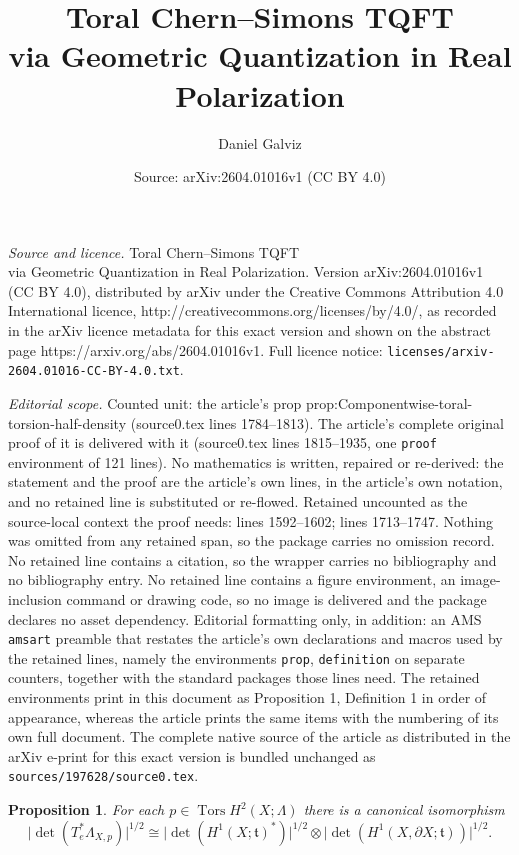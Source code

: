 \documentclass[10pt,a4paper]{amsart}
\title{Toral Chern--Simons TQFT\\via Geometric Quantization in Real Polarization}
\author{Daniel Galviz}
\date{Source: arXiv:2604.01016v1 (CC BY 4.0)}
\newtheorem{prop}{Proposition}
\begin{document}
\maketitle

\noindent\emph{Source and licence.} Toral Chern--Simons TQFT\\via Geometric Quantization in Real Polarization. Version arXiv:2604.01016v1 (CC BY 4.0), distributed by arXiv under the Creative Commons Attribution 4.0 International licence, http://creativecommons.org/licenses/by/4.0/, as recorded in the arXiv licence metadata for this exact version and shown on the abstract page https://arxiv.org/abs/2604.01016v1. Full licence notice: \texttt{licenses/arxiv-2604.01016-CC-BY-4.0.txt}.\par\smallskip

\noindent\textit{Editorial scope.} Counted unit: the article's prop prop:Componentwise-toral-torsion-half-density (source0.tex lines 1784--1813). The article's complete original proof of it is delivered with it (source0.tex lines 1815--1935, one \texttt{proof} environment of 121 lines). No mathematics is written, repaired or re-derived: the statement and the proof are the article's own lines, in the article's own notation, and no retained line is substituted or re-flowed.  Retained uncounted as the source-local context the proof needs: lines 1592--1602; lines 1713--1747.  Nothing was omitted from any retained span, so the package carries no omission record.  No retained line contains a citation, so the wrapper carries no bibliography and no bibliography entry.  No retained line contains a figure environment, an image-inclusion command or drawing code, so no image is delivered and the package declares no asset dependency.  Editorial formatting only, in addition: an AMS \texttt{amsart} preamble that restates the article's own declarations and macros used by the retained lines, namely the environments \texttt{prop}, \texttt{definition} on separate counters, together with the standard packages those lines need.  The retained environments print in this document as Proposition 1, Definition 1 in order of appearance, whereas the article prints the same items with the numbering of its own full document.  The complete native source of the article as distributed in the arXiv e-print for this exact version is bundled unchanged as \texttt{sources/197628/source0.tex}.
\begin{prop}
\label{prop:toral-determinant-line}
For each $p \in \operatorname{Tors} H^2(X;\Lambda)$ there is a canonical isomorphism
\[
\bigl|\det(T_e^* \Lambda_{X,p})\bigr|^{1/2}
\cong
\bigl|\det(H^1(X;\mathfrak t)^*)\bigr|^{1/2}
\otimes
\bigl|\det(H^1(X,\partial X;\mathfrak t))\bigr|^{1/2}.
\]
\end{prop}
\end{document}
